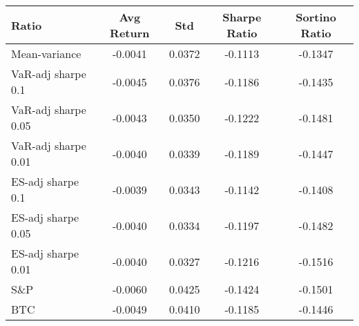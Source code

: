 \begin{tabular}{lcccc}
\toprule
Ratio & Avg Return & Std & Sharpe Ratio & Sortino Ratio\\
\midrule
Mean-variance & -0.0041 & 0.0372 & -0.1113 & -0.1347\\
VaR-adj sharpe 0.1 & -0.0045 & 0.0376 & -0.1186 & -0.1435\\
VaR-adj sharpe 0.05 & -0.0043 & 0.0350 & -0.1222 & -0.1481\\
VaR-adj sharpe 0.01 & -0.0040 & 0.0339 & -0.1189 & -0.1447\\
ES-adj sharpe 0.1 & -0.0039 & 0.0343 & -0.1142 & -0.1408\\
ES-adj sharpe 0.05 & -0.0040 & 0.0334 & -0.1197 & -0.1482\\
ES-adj sharpe 0.01 & -0.0040 & 0.0327 & -0.1216 & -0.1516\\
S\&P & -0.0060 & 0.0425 & -0.1424 & -0.1501\\
BTC & -0.0049 & 0.0410 & -0.1185 & -0.1446\\
\bottomrule
\end{tabular}
